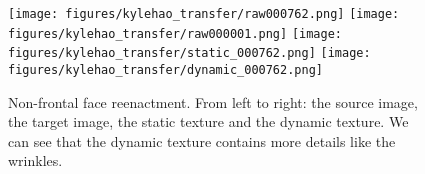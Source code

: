 
\begin{figure}[th]
\begin{center}
  \texttt{[image: figures/kylehao\_transfer/raw000762.png]}
   \texttt{[image: figures/kylehao\_transfer/raw000001.png]}
   \texttt{[image: figures/kylehao\_transfer/static\_000762.png]}
   \texttt{[image: figures/kylehao\_transfer/dynamic\_000762.png]} 
\end{center}
   \caption{Non-frontal face reenactment. From left to right: the source image, the target image, the static texture and the dynamic texture. We can see that the dynamic texture contains more details like the wrinkles.}
   \vspace{-0.05in}
\label{replaceres}
\end{figure}

\begin{table}[h!]
\begin{center}
\end{center}
\caption{Quantitative evalution.}
\vspace{-0.2in}
\label{table:paris}
\end{table}



